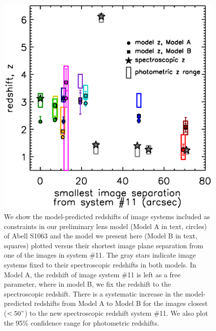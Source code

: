 \begin{figure}[h]
\includegraphics[width=\textwidth]{Chap2/c2f7.eps}
\caption[Model-predicted redshifts vs. spectroscopic redshifts for preliminary and submitted lens models of Abell S1063]{We show the model-predicted redshifts of image systems included as constraints in our preliminary lens model (Model A in text, circles) of Abell S1063 and the model we present here (Model B in text, squares) plotted versus their shortest image plane separation from one of the images in system \#11. The gray stars indicate image systems fixed to their spectroscopic redshifts in both models. In Model A, the redshift of image system \#11 is left as a free parameter, where in model B, we fix the redshift to the spectroscopic redshift. There is a systematic increase in the model-predicted redshifts from Model A to Model B for the images closest ($<50"$) to the new spectroscopic redshift system \#11. We also plot the 95\% confidence range for photometric redshifts.}
\label{chap2:fig:as1063_free_z_dist}
\end{figure}

